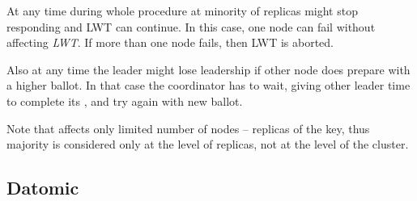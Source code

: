 At any time during whole procedure at minority of replicas might stop responding and LWT can continue. In this case, one node can fail without affecting \emph{LWT}. If more than one node fails, then LWT is aborted. 

Also at any time the leader might lose leadership if other node does prepare with a higher ballot. In that case the coordinator has to wait, giving other leader time to complete its \lwt, and try again with new ballot.

Note that \lwt affects only limited number of nodes -- replicas of the key, thus majority is considered only at the level of replicas, not at the level of the cluster.






\subsection{Datomic}
